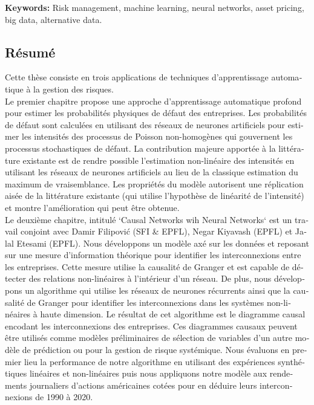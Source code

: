 \textbf{Keywords:} Risk management, machine learning, neural networks, asset pricing, big data, alternative data.



 

\begin{otherlanguage}{french}
\cleardoublepage
\chapter*{Résumé}

Cette thèse consiste en trois applications de techniques d'apprentissage automatique à la gestion des risques. \\

Le premier chapitre propose une approche d'apprentissage automatique profond pour estimer les probabilités physiques de défaut des entreprises. Les probabilités de défaut sont calculées en utilisant des réseaux de neurones artificiels pour estimer les intensités des processus de Poisson non-homogènes qui gouvernent les processus stochastiques de défaut. La contribution majeure apportée à la littérature existante est de rendre possible l'estimation non-linéaire des intensités en utilisant les réseaux de neurones artificiels au lieu de la classique estimation du maximum de vraisemblance. Les propriétés du modèle autorisent une réplication aisée de la littérature existante (qui utilise l'hypothèse de linéarité de l'intensité) et montre l'amélioration qui peut être obtenue. \\

Le deuxième chapitre, intitulé `Causal Networks wih Neural Networks` est un travail conjoint avec Damir Filipović (SFI \& EPFL), Negar Kiyavash (EPFL) et Jalal Etesami (EPFL). Nous développons un modèle axé sur les données et reposant sur une mesure d'information théorique pour identifier les interconnexions entre les entreprises. Cette mesure utilise la causalité de Granger et est capable de détecter des relations non-linéaires à l'intérieur d'un réseau. De plus, nous développons un algorithme qui utilise les réseaux de neurones récurrents ainsi que la causalité de Granger pour identifier les interconnexions dans les systèmes non-linéaires à haute dimension. Le résultat de cet algorithme est le diagramme causal encodant les interconnexions des entreprises. Ces diagrammes causaux peuvent être utilisés comme modèles préliminaires de sélection de variables d'un autre modèle de prédiction ou pour la gestion de risque systémique. Nous évaluons en premier lieu la performance de notre algorithme en utilisant des expériences synthétiques linéaires et non-linéaires puis nous appliquons notre modèle aux rendements journaliers d'actions américaines cotées pour en déduire leurs interconnexions de 1990 à 2020. \\


\end{otherlanguage}
